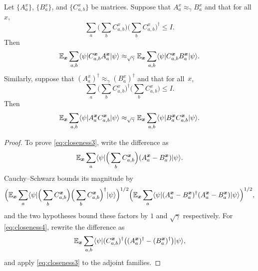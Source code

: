 \begin{theorem}\label{prop:closeness-of-ip}
	\leanok
	Let $\{A^x_a\}$, $\{B^x_a\}$, and $\{C^x_{a,b}\}$ be matrices. Suppose that $A^x_a \approx_\gamma B^x_a$ and that for all~$x$,
	\[
		\sum_a \Big(\sum_b C^x_{a,b}\Big) \Big(\sum_b C^x_{a,b}\Big)^\dagger \le I.
	\]
	Then
	\begin{equation}
		\mathbb{E}_{{\boldsymbol{x}}} \sum_{a,b} \langle \psi \rvert C^{{\boldsymbol{x}}}_{a,b} A^{{\boldsymbol{x}}}_a  \lvert \psi \rangle \approx_{\sqrt{\gamma}} \mathbb{E}_{{\boldsymbol{x}}} \sum_{a,b} \langle \psi \rvert C^{{\boldsymbol{x}}}_{a,b} B^{{\boldsymbol{x}}}_a  \lvert \psi \rangle. \label{eq:closeness3}
	\end{equation}
	Similarly, suppose that $(A^x_a)^\dagger \approx_\gamma (B^x_a)^\dagger$ and that for all~$x$,
	\[
		\sum_a \Big(\sum_b C^x_{a,b}\Big)^\dagger \Big(\sum_b C^x_{a,b}\Big) \le I.
	\]
	Then
	\begin{equation}
		\mathbb{E}_{{\boldsymbol{x}}} \sum_{a,b} \langle \psi \rvert A^{{\boldsymbol{x}}}_a  C^{{\boldsymbol{x}}}_{a,b} \lvert \psi \rangle \approx_{\sqrt{\gamma}} \mathbb{E}_{{\boldsymbol{x}}} \sum_{a,b} \langle \psi \rvert B^{{\boldsymbol{x}}}_a  C^{{\boldsymbol{x}}}_{a,b}  \lvert \psi \rangle. \label{eq:closeness4}
	\end{equation}
\end{theorem}
\begin{proof}
	\leanok
	To prove \eqref{eq:closeness3}, write the difference as
	\[
		\mathbb{E}_{{\boldsymbol{x}}} \sum_a \langle \psi \rvert \Big(\sum_b C^{\boldsymbol{x}}_{a,b}\Big) (A^{\boldsymbol{x}}_a-B^{\boldsymbol{x}}_a) \lvert \psi \rangle.
	\]
	Cauchy--Schwarz bounds its magnitude by
	\[
		\Big( \mathbb{E}_{{\boldsymbol{x}}} \sum_a \langle \psi \rvert \Big(\sum_b C^{{\boldsymbol{x}}}_{a,b}\Big)\Big(\sum_b C^{{\boldsymbol{x}}}_{a,b}\Big)^\dagger \lvert \psi \rangle \Big)^{1/2}
		\Big( \mathbb{E}_{{\boldsymbol{x}}} \sum_a \langle \psi \rvert (A^{{\boldsymbol{x}}}_a - B^{{\boldsymbol{x}}}_a)^\dagger (A^{{\boldsymbol{x}}}_a - B^{{\boldsymbol{x}}}_a) \lvert \psi \rangle \Big)^{1/2},
	\]
	and the two hypotheses bound these factors by $1$ and $\sqrt{\gamma}$ respectively. For \eqref{eq:closeness4}, rewrite the difference as
	\[
		\mathbb{E}_{{\boldsymbol{x}}} \sum_{a,b} \langle \psi \rvert (C^{{\boldsymbol{x}}}_{a,b})^\dagger \big((A^{{\boldsymbol{x}}}_a)^\dagger-(B^{{\boldsymbol{x}}}_a)^\dagger\big) \lvert \psi \rangle,
	\]
	and apply \eqref{eq:closeness3} to the adjoint families.
\end{proof}


